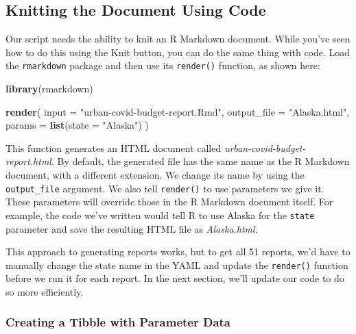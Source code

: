 \documentclass[
]{book}
\newenvironment{Shaded}{\begin{snugshade}}{\end{snugshade}}
\newcommand{\AttributeTok}[1]{\textcolor[rgb]{0.13,0.29,0.53}{#1}}
\newcommand{\FunctionTok}[1]{\textcolor[rgb]{0.13,0.29,0.53}{\textbf{#1}}}
\newcommand{\NormalTok}[1]{#1}
\newcommand{\StringTok}[1]{\textcolor[rgb]{0.31,0.60,0.02}{#1}}
\begin{document}
\hypertarget{knitting-the-document-using-code}{%
\subsection*{Knitting the Document Using Code}\label{knitting-the-document-using-code}}

Our script needs the ability to knit an R Markdown document. While you've seen how to do this using the Knit button, you can do the same thing with code. Load the \texttt{rmarkdown} package and then use its \texttt{render()} function, as shown here:

\begin{Shaded}
\begin{Highlighting}[]
\FunctionTok{library}\NormalTok{(rmarkdown)}

\FunctionTok{render}\NormalTok{(}
  \AttributeTok{input =} \StringTok{"urban{-}covid{-}budget{-}report.Rmd"}\NormalTok{,}
  \AttributeTok{output\_file =} \StringTok{"Alaska.html"}\NormalTok{,}
  \AttributeTok{params =} \FunctionTok{list}\NormalTok{(}\AttributeTok{state =} \StringTok{"Alaska"}\NormalTok{)}
\NormalTok{)}
\end{Highlighting}
\end{Shaded}

This function generates an HTML document called \emph{urban-covid-budget-report.html}. By default, the generated file has the same name as the R Markdown document, with a different extension. We change its name by using the \texttt{output\_file} argument. We also tell \texttt{render()} to use parameters we give it. These parameters will override those in the R Markdown document itself. For example, the code we've written would tell R to use Alaska for the \texttt{state} parameter and save the resulting HTML file as \emph{Alaska.html}.

This approach to generating reports works, but to get all 51 reports, we'd have to manually change the state name in the YAML and update the \texttt{render()} function before we run it for each report. In the next section, we'll update our code to do so more efficiently.

\hypertarget{creating-a-tibble-with-parameter-data}{%
\subsubsection*{Creating a Tibble with Parameter Data}\label{creating-a-tibble-with-parameter-data}}
\end{document}
